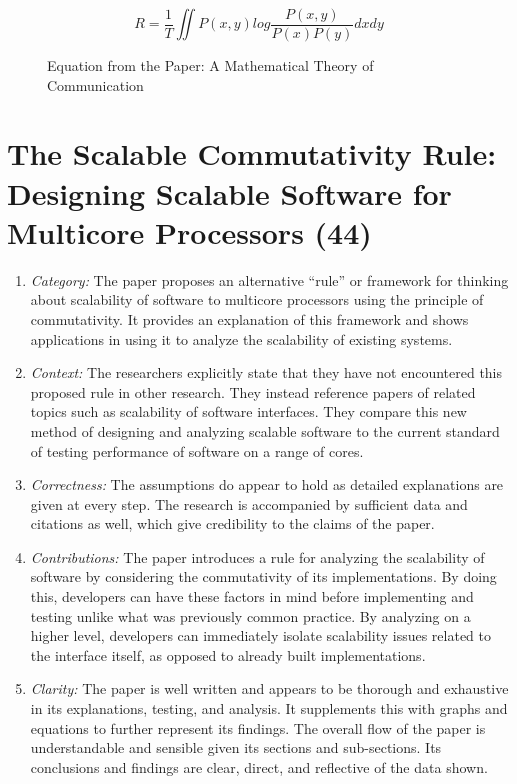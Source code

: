 \documentclass{article}
\begin{document}
\begin{figure}[h]
    \begin{equation*}
        R = \frac{1}{T} \iint P(x,y) log \frac{P(x,y)}{P(x)P(y)} dxdy    
    \end{equation*}
    \caption{Equation from the Paper: A Mathematical Theory of Communication}
\end{figure}


\section{The Scalable Commutativity Rule: Designing Scalable Software for Multicore Processors (44)}

\begin{enumerate}
    \item \textit{Category:} The paper proposes an alternative “rule” or framework for thinking about
    scalability of software to multicore processors using the principle of commutativity. It
    provides an explanation of this framework and shows applications in using it to analyze
    the scalability of existing systems.
        
    \item \textit{Context:} The researchers explicitly state that they have not encountered this proposed
    rule in other research. They instead reference papers of related topics such as
    scalability of software interfaces. They compare this new method of designing and
    analyzing scalable software to the current standard of testing performance of software
    on a range of cores.    
    
    \item \textit{Correctness:} The assumptions do appear to hold as detailed explanations are given at every
    step. The research is accompanied by sufficient data and citations as well, which give
    credibility to the claims of the paper.    
    
    \item \textit{Contributions:} The paper introduces a rule for analyzing the scalability of software by
    considering the commutativity of its implementations. By doing this, developers can
    have these factors in mind before implementing and testing unlike what was previously
    common practice. By analyzing on a higher level, developers can immediately isolate
    scalability issues related to the interface itself, as opposed to already built
    implementations.
    
    \item \textit{Clarity:} The paper is well written and appears to be thorough and exhaustive in its
    explanations, testing, and analysis. It supplements this with graphs and equations to
    further represent its findings. The overall flow of the paper is understandable and
    sensible given its sections and sub-sections. Its conclusions and findings are clear,
    direct, and reflective of the data shown.
    
\end{enumerate}
\end{document}
